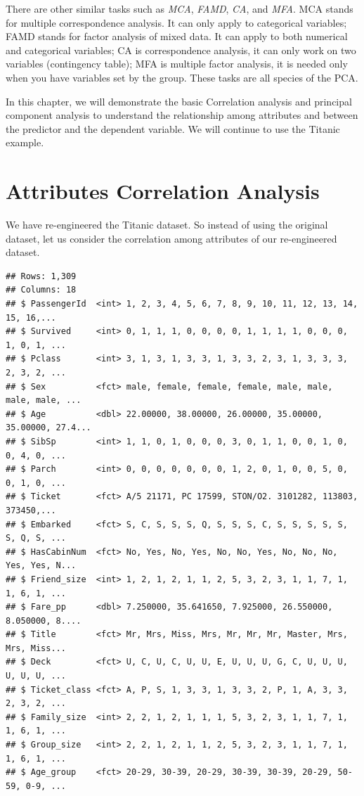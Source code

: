 \documentclass[
]{book}
\begin{document}
There are other similar tasks such as \emph{MCA}, \emph{FAMD}, \emph{CA}, and \emph{MFA}. MCA stands for multiple correspondence analysis. It can only apply to categorical variables; FAMD stands for factor analysis of mixed data. It can apply to both numerical and categorical variables; CA is correspondence analysis, it can only work on two variables (contingency table); MFA is multiple factor analysis, it is needed only when you have variables set by the group. These tasks are all species of the PCA.

In this chapter, we will demonstrate the basic Correlation analysis and principal component analysis to understand the relationship among attributes and between the predictor and the dependent variable. We will continue to use the Titanic example.

\hypertarget{attributes-correlation-analysis}{%
\section{Attributes Correlation Analysis}\label{attributes-correlation-analysis}}

We have re-engineered the Titanic dataset. So instead of using the original dataset, let us consider the correlation among attributes of our re-engineered dataset.

\begin{verbatim}
## Rows: 1,309
## Columns: 18
## $ PassengerId  <int> 1, 2, 3, 4, 5, 6, 7, 8, 9, 10, 11, 12, 13, 14, 15, 16,...
## $ Survived     <int> 0, 1, 1, 1, 0, 0, 0, 0, 1, 1, 1, 1, 0, 0, 0, 1, 0, 1, ...
## $ Pclass       <int> 3, 1, 3, 1, 3, 3, 1, 3, 3, 2, 3, 1, 3, 3, 3, 2, 3, 2, ...
## $ Sex          <fct> male, female, female, female, male, male, male, male, ...
## $ Age          <dbl> 22.00000, 38.00000, 26.00000, 35.00000, 35.00000, 27.4...
## $ SibSp        <int> 1, 1, 0, 1, 0, 0, 0, 3, 0, 1, 1, 0, 0, 1, 0, 0, 4, 0, ...
## $ Parch        <int> 0, 0, 0, 0, 0, 0, 0, 1, 2, 0, 1, 0, 0, 5, 0, 0, 1, 0, ...
## $ Ticket       <fct> A/5 21171, PC 17599, STON/O2. 3101282, 113803, 373450,...
## $ Embarked     <fct> S, C, S, S, S, Q, S, S, S, C, S, S, S, S, S, S, Q, S, ...
## $ HasCabinNum  <fct> No, Yes, No, Yes, No, No, Yes, No, No, No, Yes, Yes, N...
## $ Friend_size  <int> 1, 2, 1, 2, 1, 1, 2, 5, 3, 2, 3, 1, 1, 7, 1, 1, 6, 1, ...
## $ Fare_pp      <dbl> 7.250000, 35.641650, 7.925000, 26.550000, 8.050000, 8....
## $ Title        <fct> Mr, Mrs, Miss, Mrs, Mr, Mr, Mr, Master, Mrs, Mrs, Miss...
## $ Deck         <fct> U, C, U, C, U, U, E, U, U, U, G, C, U, U, U, U, U, U, ...
## $ Ticket_class <fct> A, P, S, 1, 3, 3, 1, 3, 3, 2, P, 1, A, 3, 3, 2, 3, 2, ...
## $ Family_size  <int> 2, 2, 1, 2, 1, 1, 1, 5, 3, 2, 3, 1, 1, 7, 1, 1, 6, 1, ...
## $ Group_size   <int> 2, 2, 1, 2, 1, 1, 2, 5, 3, 2, 3, 1, 1, 7, 1, 1, 6, 1, ...
## $ Age_group    <fct> 20-29, 30-39, 20-29, 30-39, 30-39, 20-29, 50-59, 0-9, ...
\end{verbatim}
\end{document}
